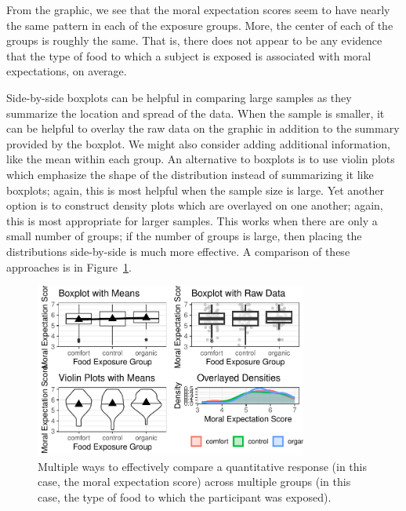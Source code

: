 \documentclass[
  letterpaper,
  DIV=11,
  numbers=noendperiod]{scrreprt}
\theoremstyle{definition}
\theoremstyle{definition}
\theoremstyle{plain}
\theoremstyle{remark}
\begin{document}
From the graphic, we see that the moral expectation scores seem to have
nearly the same pattern in each of the exposure groups. More, the center
of each of the groups is roughly the same. That is, there does not
appear to be any evidence that the type of food to which a subject is
exposed is associated with moral expectations, on average.

Side-by-side boxplots can be helpful in comparing large samples as they
summarize the location and spread of the data. When the sample is
smaller, it can be helpful to overlay the raw data on the graphic in
addition to the summary provided by the boxplot. We might also consider
adding additional information, like the mean within each group. An
alternative to boxplots is to use violin plots which emphasize the shape
of the distribution instead of summarizing it like boxplots; again, this
is most helpful when the sample size is large. Yet another option is to
construct density plots which are overlayed on one another; again, this
is most appropriate for larger samples. This works when there are only a
small number of groups; if the number of groups is large, then placing
the distributions side-by-side is much more effective. A comparison of
these approaches is in
Figure~\ref{fig-anovasummaries-organic-comparison}.

\begin{figure}

{\centering \includegraphics[width=0.8\textwidth,height=\textheight]{./images/fig-anovasummaries-organic-comparison-1.pdf}

}

\caption{\label{fig-anovasummaries-organic-comparison}Multiple ways to
effectively compare a quantitative response (in this case, the moral
expectation score) across multiple groups (in this case, the type of
food to which the participant was exposed).}

\end{figure}
\end{document}
